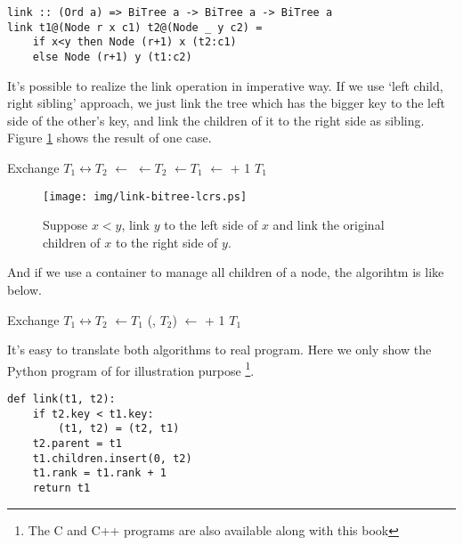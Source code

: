 \documentclass{article}
\begin{document}
\lstset{language=Haskell}
\begin{lstlisting}
link :: (Ord a) => BiTree a -> BiTree a -> BiTree a
link t1@(Node r x c1) t2@(Node _ y c2) = 
    if x<y then Node (r+1) x (t2:c1)
    else Node (r+1) y (t1:c2)
\end{lstlisting}

It's possible to realize the link operation in imperative way.
If we use `left child, right sibling' approach, we just link
the tree which has the bigger key to the left side of the other's
key, and link the children of it to the right side as sibling.
Figure \ref{fig:link-lcrs} shows the result of one case.

\begin{algorithmic}[1]
    \State Exchange $T_1 \leftrightarrow T_2$
  \EndIf
  \State {} $\gets$ 
  \State {} $\gets T_2$
  \State {} $\gets T_1$
  \State {} $\gets$  + 1
  \State \Return $T_1$
\EndFunction
\end{algorithmic}

\begin{figure}[htbp]
  \centering
  \texttt{[image: img/link-bitree-lcrs.ps]}
  \caption{Suppose $x < y$, link $y$ to the left side of $x$ and link the original children of $x$ to the right side of $y$.} \label{fig:link-lcrs}
\end{figure}

And if we use a container to manage all children of a node, the
algorihtm is like below.

\begin{algorithmic}[1]
    \State Exchange $T_1 \leftrightarrow T_2$
  \EndIf
  \State {} $\gets T_1$
  \State {}(, $T_2$)
  \State {} $\gets$  + 1
  \State \Return $T_1$
\EndFunction
\end{algorithmic}

It's easy to translate both algorithms to real program. Here we only show the Python program of  for illustration purpose \footnote{The C and C++ programs are also available along with this book}.

\lstset{language=Python}
\begin{lstlisting}
def link(t1, t2):
    if t2.key < t1.key:
        (t1, t2) = (t2, t1)
    t2.parent = t1
    t1.children.insert(0, t2)
    t1.rank = t1.rank + 1
    return t1
\end{lstlisting}
\end{document}
